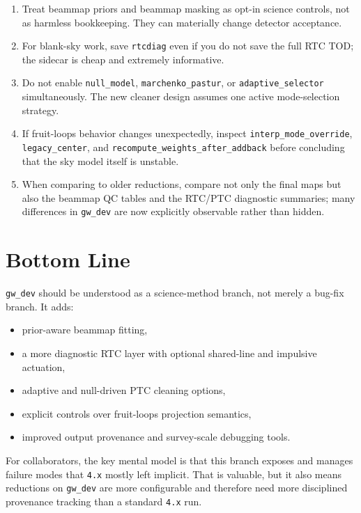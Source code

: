 \documentclass[11pt]{article}
\begin{document}
\begin{enumerate}[leftmargin=1.5em]
\item Treat beammap priors and beammap masking as opt-in science controls, not
as harmless bookkeeping. They can materially change detector acceptance.
\item For blank-sky work, save \texttt{rtcdiag} even if you do not save the full
RTC TOD; the sidecar is cheap and extremely informative.
\item Do not enable \texttt{null\_model}, \texttt{marchenko\_pastur}, or
\texttt{adaptive\_selector} simultaneously. The new cleaner design assumes one
active mode-selection strategy.
\item If fruit-loops behavior changes unexpectedly, inspect
\texttt{interp\_mode\_override}, \texttt{legacy\_center}, and
\texttt{recompute\_weights\_after\_addback} before concluding that the sky model
itself is unstable.
\item When comparing to older reductions, compare not only the final maps but
also the beammap QC tables and the RTC/PTC diagnostic summaries; many
differences in \texttt{gw\_dev} are now explicitly observable rather than hidden.
\end{enumerate}

\section{Bottom Line}

\texttt{gw\_dev} should be understood as a science-method branch, not merely a
bug-fix branch. It adds:

\begin{itemize}[leftmargin=1.5em]
\item prior-aware beammap fitting,
\item a more diagnostic RTC layer with optional shared-line and impulsive
actuation,
\item adaptive and null-driven PTC cleaning options,
\item explicit controls over fruit-loops projection semantics,
\item improved output provenance and survey-scale debugging tools.
\end{itemize}

For collaborators, the key mental model is that this branch exposes and manages
failure modes that \texttt{4.x} mostly left implicit. That is valuable, but it
also means reductions on \texttt{gw\_dev} are more configurable and therefore
need more disciplined provenance tracking than a standard \texttt{4.x} run.
\end{document}
